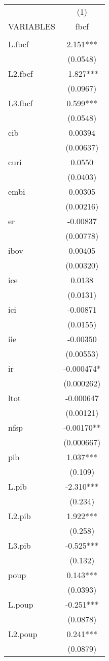 \begin{tabular}{lc} \hline
 & (1) \\
VARIABLES & fbcf \\ \hline
 &  \\
L.fbcf & 2.151*** \\
 & (0.0548) \\
L2.fbcf & -1.827*** \\
 & (0.0967) \\
L3.fbcf & 0.599*** \\
 & (0.0548) \\
cib & 0.00394 \\
 & (0.00637) \\
curi & 0.0550 \\
 & (0.0403) \\
embi & 0.00305 \\
 & (0.00216) \\
er & -0.00837 \\
 & (0.00778) \\
ibov & 0.00405 \\
 & (0.00320) \\
ice & 0.0138 \\
 & (0.0131) \\
ici & -0.00871 \\
 & (0.0155) \\
iie & -0.00350 \\
 & (0.00553) \\
ir & -0.000474* \\
 & (0.000262) \\
ltot & -0.000647 \\
 & (0.00121) \\
nfsp & -0.00170** \\
 & (0.000667) \\
pib & 1.037*** \\
 & (0.109) \\
L.pib & -2.310*** \\
 & (0.234) \\
L2.pib & 1.922*** \\
 & (0.258) \\
L3.pib & -0.525*** \\
 & (0.132) \\
poup & 0.143*** \\
 & (0.0393) \\
L.poup & -0.251*** \\
 & (0.0878) \\
L2.poup & 0.241*** \\
 & (0.0879) \\

\end{tabular}
